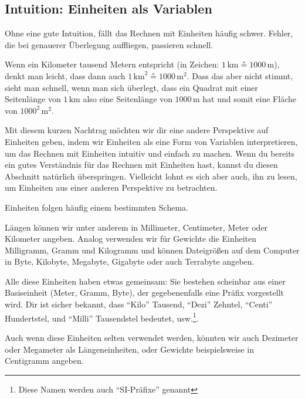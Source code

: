 \documentclass[../../main.tex]{subfiles}
\begin{document}
    \subsection*{Intuition: Einheiten als Variablen}
    Ohne eine gute Intuition, fällt das Rechnen mit Einheiten häufig schwer. Fehler, die bei genauerer Überlegung
    auffliegen, passieren schnell.
    \begin{example}{}
        Wenn ein Kilometer tausend Metern entspricht (in Zeichen: $1\,\text{km} \corresponds 1000\,\text{m}$), denkt man
        leicht, dass dann auch $1\,\text{km}^2 \corresponds 1000\,\text{m}^2$.
        Dass das aber nicht stimmt, sieht man schnell, wenn man sich überlegt, dass ein Quadrat mit einer Seitenlänge
        von $1\,\text{km}$ also eine Seitenlänge von $1000\,\text{m}$ hat und somit eine Fläche von $1000^2\,\text{m}^2$.
    \end{example}

    Mit diesem kurzen Nachtrag möchten wir dir eine andere Perspektive auf Einheiten geben, indem wir Einheiten als eine
    Form von Variablen interpretieren, um das Rechnen mit Einheiten intuitiv und einfach zu machen.
    Wenn du bereits ein gutes Verständnis für das Rechnen mit Einheiten hast, kannst du diesen Abschnitt natürlich
    überspringen. Vielleicht lohnt es sich aber auch, ihn zu lesen, um Einheiten aus einer anderen Perspektive zu
    betrachten.

    Einheiten folgen häufig einem bestimmten Schema.
    \begin{example}{}
        Längen können wir unter anderem in Millimeter, Centimeter, Meter oder Kilometer angeben. Analog verwenden wir
        für Gewichte die Einheiten Milligramm, Gramm und Kilogramm und können Dateigrößen auf dem Computer in Byte,
        Kilobyte, Megabyte, Gigabyte oder auch Terrabyte angeben.

        Alle diese Einheiten haben etwas gemeinsam: Sie bestehen scheinbar aus einer Basiseinheit (Meter, Gramm, Byte),
        der gegebenenfalls eine Präfix vorgestellt wird.
        Dir ist sicher bekannt, dass \enquote{Kilo} Tausend, \enquote{Dezi} Zehntel, \enquote{Centi} Hundertstel, und
        \enquote{Milli} Tausendstel bedeutet, usw.\footnote{Diese Namen werden auch \enquote{SI-Präfixe}
        genannt}.

        Auch wenn diese Einheiten selten verwendet werden, könnten wir auch Dezimeter oder Megameter als
        Längeneinheiten, oder Gewichte beispielsweise in Centigramm angeben.
    \end{example}
\end{document}
